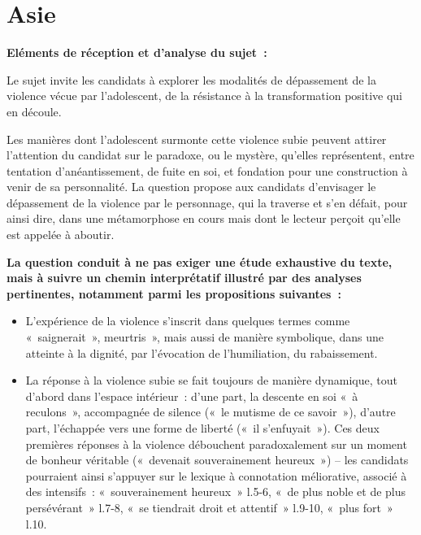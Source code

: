 \section{Asie}
		{\textbf{Eléments de réception et d'analyse du sujet~:}
		
		Le sujet invite les candidats à explorer les modalités de dépassement de la
violence vécue par l'adolescent, de la résistance à la transformation positive qui en
découle.

Les manières dont l'adolescent surmonte cette violence subie peuvent attirer
l'attention du candidat sur le paradoxe, ou le mystère, qu'elles représentent, entre
tentation d'anéantissement, de fuite en soi, et fondation pour une construction à venir
de sa personnalité. La question propose aux candidats d'envisager le dépassement
de la violence par le personnage, qui la traverse et s'en défait, pour ainsi dire, dans
une métamorphose en cours mais dont le lecteur perçoit qu'elle est appelée à aboutir.
		
\textbf{La question conduit à ne pas exiger une étude exhaustive du texte, mais à suivre un chemin interprétatif illustré par des analyses pertinentes, notamment parmi les propositions suivantes~:}
		
\begin{itemize}
\item L'expérience de la violence s'inscrit dans quelques termes comme
«~saignerait~», meurtris~», mais aussi de manière symbolique, dans une atteinte à la
dignité, par l'évocation de l'humiliation, du rabaissement.

\item La réponse à la violence subie se fait toujours de manière dynamique, tout
d'abord dans l'espace intérieur~: d'une part, la descente en soi «~à reculons~»,
accompagnée de silence («~le mutisme de ce savoir~»), d'autre part, l'échappée vers
une forme de liberté («~il s'enfuyait~»). Ces deux premières réponses à la violence
débouchent paradoxalement sur un moment de bonheur véritable («~devenait
souverainement heureux~») – les candidats pourraient ainsi s'appuyer sur le lexique à connotation méliorative, associé à des intensifs~: «~souverainement heureux~» l.5-6,
«~de plus noble et de plus persévérant~» l.7-8, «~se tiendrait droit et attentif~» l.9-10,
«~plus fort~» l.10.


\end{itemize}}
